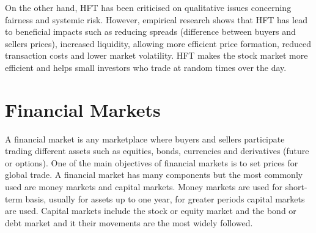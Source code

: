 On the other hand, HFT has been criticised on qualitative issues concerning
fairness and systemic risk. However, empirical research shows that HFT has lead to
beneficial impacts such as reducing spreads (difference between buyers and
sellers prices), increased liquidity, allowing more efficient price formation,
reduced transaction costs and lower market volatility. HFT makes the stock market more efficient and helps small investors who trade at random times over the day. 


\section{Financial Markets}

A financial market is any marketplace where buyers and sellers participate
trading different assets such as equities, bonds, currencies and derivatives
(future or options). One of the main objectives of financial markets is to set
prices for global trade.
A financial market has many components but the most commonly used are money
markets and capital markets. Money markets are used for short-term basis,
usually for assets up to one year, for greater periods capital markets are used.
Capital markets include the stock or equity market and the bond or debt market
and it their movements are the most widely followed.

